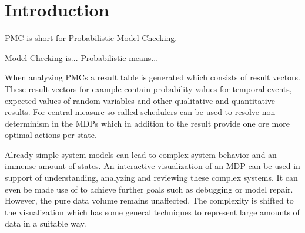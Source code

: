 \documentclass[preview]{standalone}
\begin{document}
\section{Introduction}
PMC is short for Probabilistic Model Checking.

Model Checking is...
Probabilistic means...

When analyzing PMCs a result table is generated which consists of result vectors. These result vectors for example contain probability values for temporal events, expected values of random variables and other qualitative and quantitative results. For central measure so called schedulers can be used to resolve non-determinism in the MDPs which in addition to the result provide one ore more optimal actions per state.

Already simple system models can lead to complex system behavior and an immense amount of states. An interactive visualization of an MDP can be used in support of understanding, analyzing and reviewing these complex systems. It can even be made use of to achieve further goals such as debugging or model repair. However, the pure data volume remains unaffected. The complexity is shifted to the visualization which has some general techniques to represent large amounts of data in a suitable way.

\end{document}
